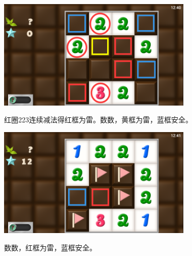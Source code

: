 \subsection{} %
\begin{center}
    \includegraphics[width=0.7\textwidth]{puzzle/132-1.png}
\end{center}
红圈223连续减法得红框为雷。数数，黄框为雷，蓝框安全。
\begin{center}
    \includegraphics[width=0.7\textwidth]{puzzle/132-2.png}
\end{center}
数数，红框为雷，蓝框安全。

